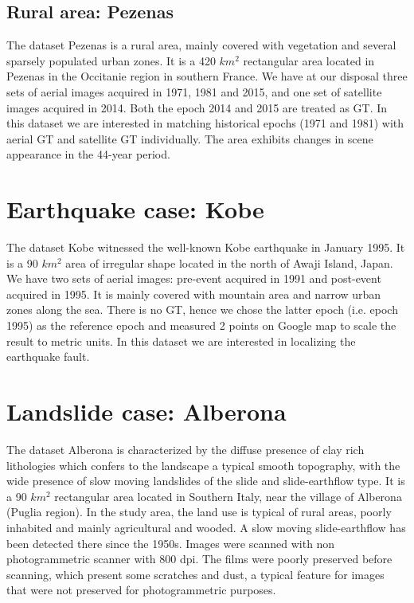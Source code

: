 \subsection{Rural area: Pezenas}
The dataset Pezenas is a rural area, mainly covered with vegetation and several sparsely populated urban zones. It is a 420 $km^2$ rectangular area located in Pezenas in the Occitanie region in southern France. We have at our disposal three sets of aerial images acquired in 1971, 1981 and 2015, and one set of satellite images acquired in 2014. Both the epoch 2014 and 2015 are treated as \ac{GT}. In this dataset we are interested in matching historical epochs (1971 and 1981) with aerial \ac{GT} and satellite \ac{GT} individually. The area exhibits changes in scene appearance in the 44-year period.\\

\section{Earthquake case: Kobe}
The dataset Kobe witnessed the well-known Kobe earthquake in January 1995. It is a 90 $km^2$ area of irregular shape located in the north of Awaji Island, Japan. We have two sets of aerial images: pre-event acquired in 1991 and post-event acquired in 1995. It is mainly covered with mountain area and narrow urban zones along the sea. There is no \ac{GT}, hence we chose the latter epoch (i.e. epoch 1995) as the reference epoch and measured 2 points on Google map to scale the result to metric units. In this dataset we are interested in localizing the earthquake fault.

\section{Landslide case: Alberona}
The dataset Alberona is characterized by the diffuse presence of clay rich lithologies which confers to the landscape a typical smooth topography, with the wide presence of slow moving landslides of the slide and slide-earthflow type. It is a 90 $km^2$ rectangular area located in Southern Italy, near the village of Alberona (Puglia region). 
In the study area, the land use is typical of rural areas, poorly inhabited and mainly agricultural and wooded. A slow moving slide-earthflow has been detected there since the 1950s. 
Images were scanned with non photogrammetric scanner with 800 dpi. The films were poorly
preserved before scanning, which present some scratches and dust, a typical feature for images that were not preserved for
photogrammetric purposes.

